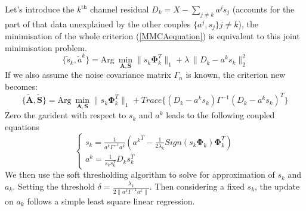 Let's introduce the $k^{\text{th}}$ channel residual $D_k = X - \sum_{j \neq k}a^j s_{j}$ (accounts for the part of that data unexplained by the other couples $\{a^j, s_j\}j \neq k$), the minimisation of the whole criterion (\ref{MMCAequation}) is equivalent to this joint minimisation problem.
\begin{equation}
    \{\tilde{s}_k, \tilde{a}^k\} = \text{Arg} \: \min_{\mathbf{A},\mathbf{S}} \lVert s_k \mathbf{\Phi}_k^T \rVert_{1} + \lambda \:\lVert D_k - a^ks_k \rVert^2_2
    \label{MMCAequation2}
\end{equation}
If we also assume the noise covariance matrix $\Gamma_n$ is known, the criterion new becomes:
\begin{equation}
    \{\mathbf{\tilde{A},\tilde{S}}\} = \text{Arg} \: \min_{\mathbf{A},\mathbf{S}} \lVert s_k \mathbf{\Phi}_k^T \rVert_{1} + Trace \{ (D_k - a^ks_k)\Gamma^{-1}(D_k - a^ks_k)^T\}
    \label{MMCAequation3}
\end{equation}
Zero the garident with respect to $s_k$ and $a^k$ leads to the following coupled equations
\begin{equation}
    \begin{cases}
       s_k = \frac{1}{a^k\Gamma^{-1}a^k}({a^k}^T - \frac{1}{2\lambda_k} Sign(s_k \mathbf{\Phi}_k) \mathbf{\Phi}_k^T)\\
       a^k = \frac{1}{s_ks_k^T}D_k s_k^T
    \end{cases}
\end{equation}
We then use the soft thresholding algorithm to solve for approximation of $s_k$ and $a_k$. Setting the threshold $\delta = \frac{\lambda_k}{2\lVert a^k\Gamma^{-1}a^k \rVert}$. Then considering a fixed $s_k$, the update on $a_k$ follows a simple least square linear regression.\\

